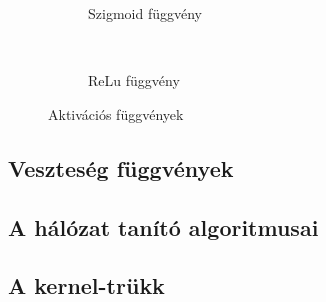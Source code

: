 \begin{figure}[h]
	\centering
	\begin{subfigure}[b]{0.3\textwidth}
		\def\svgwidth{0.5\columnwidth}
		
		\caption{Szigmoid függvény}
		\label{fig:sigmoid}
	\end{subfigure}
	~
	\begin{subfigure}[b]{0.3\textwidth}
		\def\svgwidth{0.5\columnwidth}
		
		\caption{ReLu függvény}
	\end{subfigure}
	\caption{Aktivációs függvények }
\end{figure}
\subsection{Veszteség függvények}

\subsection{A hálózat tanító algoritmusai}

\subsection{A kernel-trükk}

